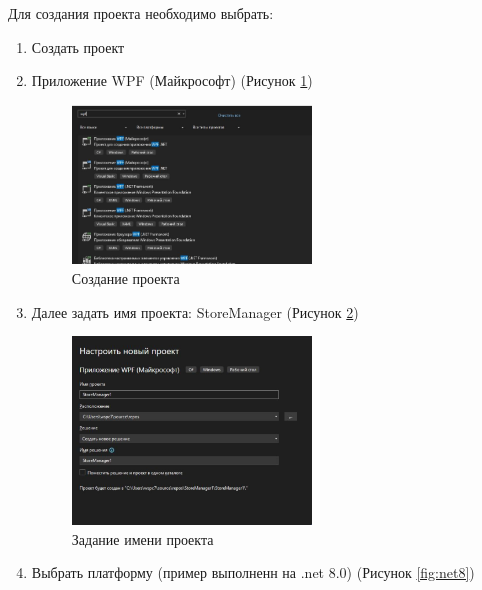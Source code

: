 \documentclass[12pt]{article}
\begin{document}
Для создания проекта необходимо выбрать:
\begin{enumerate}
	\item Создать проект
	\item Приложение WPF (Майкрософт) (Рисунок \ref{fig:projectcreate})

	      \begin{figure}[H]
		      \centering
		      \includegraphics[width=0.6\textwidth]{fig/projectCreate.png}
		      \caption{Создание проекта}
		      \label{fig:projectcreate}
	      \end{figure}

	\item Далее задать имя проекта: StoreManager (Рисунок \ref{fig:createnameproject})

	      \begin{figure}[H]
		      \centering
		      \includegraphics[width=0.6\textwidth]{fig/createNameProject.png}
		      \caption{Задание имени проекта}
		      \label{fig:createnameproject}
	      \end{figure}

	      \newpage

	\item Выбрать платформу (пример выполненн на .net 8.0) (Рисунок \ref{fig:net8})


\end{enumerate}
\end{document}
